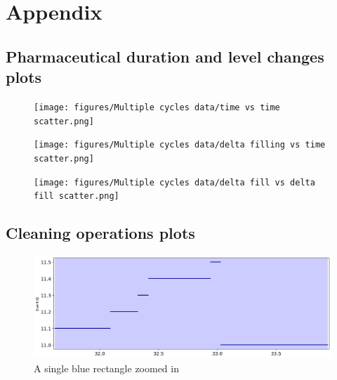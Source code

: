 \documentclass[../Thesis.tex]{subfiles}
\begin{document}
\chapter{Appendix}

\section{Pharmaceutical duration and level changes plots}
\begin{figure}[H]
    \centering
    \texttt{[image: figures/Multiple cycles data/time vs time scatter.png]}
    \caption{}
    \label{fig:time vs time all}
\end{figure}

\begin{figure}[H]
    \centering
    \texttt{[image: figures/Multiple cycles data/delta filling vs time scatter.png]}
    \caption{}
    \label{fig:time vs level all}
\end{figure}

\begin{figure}[H]
    \centering
    \texttt{[image: figures/Multiple cycles data/delta fill vs delta fill scatter.png]}
    \caption{}
    \label{fig:level vs level all}
\end{figure}

\newpage

\section{Cleaning operations plots}
\begin{figure}[H]
    \centering
    \includegraphics[width=0.9\linewidth]{figures/Multiple cycles data/Cleaning batches timeseries single.png}
    \caption{A single blue rectangle zoomed in}
    \label{fig:cycle cleaning time series single}
\end{figure}
\end{document}
